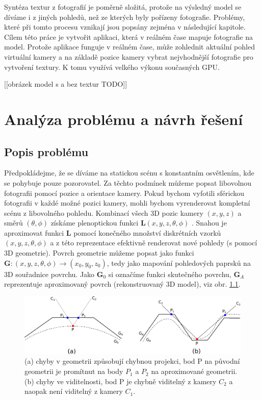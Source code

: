 \documentclass[11pt,twoside,a4paper]{book}
\begin{document}
Syntéza textur z fotografií je poměrně složitá, protože 	na výsledný model se díváme i z jiných pohledů, než ze kterých byly pořízeny fotografie. Problémy, které při tomto procesu vznikají jsou popsány zejména v následující kapitole. Cílem této práce je vytvořit aplikaci, která v reálném čase mapuje fotografie na model. Protože aplikace funguje v reálném čase, může zohlednit aktuální pohled virtuální kamery a na základě pozice kamery vybrat nejvhodnější fotografie pro vytvoření textury. K tomu využívá velkého výkonu současných GPU.

[[obrázek model s a bez textur TODO]]


\chapter{Analýza problému a návrh řešení} %

\section{Popis problému}

Předpokládejme, že se díváme na statickou scénu s konstantním osvětlením, kde se pohybuje pouze pozorovatel. Za těchto podmínek můžeme popsat libovolnou fotografii pomocí pozice a orientace kamery. Pokud bychom vyfotili sférickou fotografii v každé možné pozici kamery, mohli bychom vyrenderovat kompletní scénu z libovolného pohledu. Kombinací všech 3D pozic kamery $(x, y, z)$ a směrů $(\theta, \phi)$ získáme plenoptickou funkci $\textbf{L}(x, y, z, \theta, \phi)$ \cite{Adelson91}. Snahou je aproximovat funkci \textbf{L} pomocí konečného množství diskrétních vzorků $(x, y, z, \theta, \phi)$ a z této reprezentace efektivně renderovat nové pohledy (s pomocí 3D geometrie). Povrch geometrie můžeme popsat jako funkci $\textbf{G} : (x, y, z, \theta, \phi) \to (x_0, y_0, z_0)$, tedy jako mapování pohledových paprsků na 3D souřadnice povrchu. Jako $\textbf{G}_0$ si označíme funkci skutečného povrchu, $\textbf{G}_A$  reprezentuje aproximovaný povrch (rekonstruovaný 3D model), viz obr. \ref{fig:projection-error}.

\begin{figure}[hb]
\begin{center}
\includegraphics[width=\textwidth]{figures/projection-error}
\caption{(a) chyby v geometrii způsobují chybnou projekci, bod P na původní geometrii je promítnut na body $P_1$ a $P_2$ na aproximované geometrii. (b) chyby ve viditelnosti, bod P je chybně viditelný z kamery $C_2$ a naopak není viditelný z kamery $C_1$.}
\label{fig:projection-error}
\end{center}
\end{figure}
\end{document}
